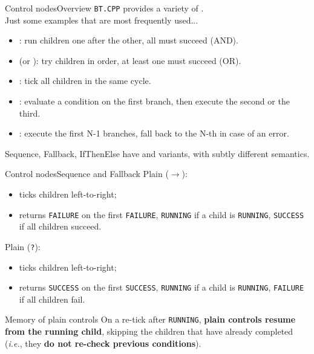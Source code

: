 \begin{frame}{Control nodes}{Overview}
  \justifying
  \texttt{BT.CPP} provides a variety of .\\
  Just some examples that are most frequently used...
  \begin{itemize}
    \item {}: run children one after the other, all must succeed (AND).
    \item {} (or ): try children in order, at least one must succeed (OR).
    \item {}: tick all children in the same cycle.
    \item {}: evaluate a condition on the first branch, then execute the second or the third.
    \item {}: execute the first N-1 branches, fall back to the N-th in case of an error.
  \end{itemize}
  \bigskip
  Sequence, Fallback, IfThenElse have  and  variants, with subtly different semantics.
\end{frame}
\begin{frame}{Control nodes}{Sequence and Fallback}
  \justifying
  Plain  (\texttt{$\rightarrow$}):
  \begin{itemize}
    \item ticks children left-to-right;
    \item returns \texttt{FAILURE} on the first \texttt{FAILURE}, \texttt{RUNNING} if a child is \texttt{RUNNING}, \texttt{SUCCESS} if all children succeed.
  \end{itemize}
  \bigskip
  Plain  (\texttt{?}):
  \begin{itemize}
    \item ticks children left-to-right;
    \item returns \texttt{SUCCESS} on the first \texttt{SUCCESS}, \texttt{RUNNING} if a child is \texttt{RUNNING}, \texttt{FAILURE} if all children fail.
  \end{itemize}
  \bigskip
  \begin{block}{Memory of plain controls}
    \justifying
    On a re-tick after \texttt{RUNNING}, \textbf{plain controls resume from the running child}, skipping the children that have already completed (\emph{i.e.}, they \textbf{do not re-check previous conditions}).
  \end{block}
\end{frame}
